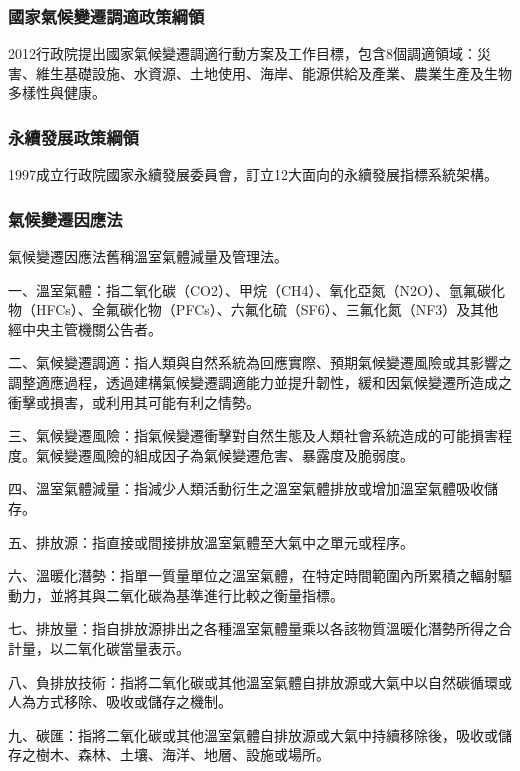 \documentclass[a4paper,12pt]{report}
\begin{document}
\begin{itemize}
\subsubsection{國家氣候變遷調適政策綱領}
2012行政院提出國家氣候變遷調適行動方案及工作目標，包含8個調適領域：災害、維生基礎設施、水資源、土地使用、海岸、能源供給及產業、農業生產及生物多樣性與健康。
\subsubsection{永續發展政策綱領}
1997成立行政院國家永續發展委員會，訂立12大面向的永續發展指標系統架構。
\subsubsection{氣候變遷因應法}
氣候變遷因應法舊稱溫室氣體減量及管理法。

一、溫室氣體：指二氧化碳（CO2）、甲烷（CH4）、氧化亞氮（N2O）、氫氟碳化物（HFCs）、全氟碳化物（PFCs）、六氟化硫（SF6）、三氟化氮（NF3）及其他經中央主管機關公告者。

二、氣候變遷調適：指人類與自然系統為回應實際、預期氣候變遷風險或其影響之調整適應過程，透過建構氣候變遷調適能力並提升韌性，緩和因氣候變遷所造成之衝擊或損害，或利用其可能有利之情勢。

三、氣候變遷風險：指氣候變遷衝擊對自然生態及人類社會系統造成的可能損害程度。氣候變遷風險的組成因子為氣候變遷危害、暴露度及脆弱度。

四、溫室氣體減量：指減少人類活動衍生之溫室氣體排放或增加溫室氣體吸收儲存。

五、排放源：指直接或間接排放溫室氣體至大氣中之單元或程序。

六、溫暖化潛勢：指單一質量單位之溫室氣體，在特定時間範圍內所累積之輻射驅動力，並將其與二氧化碳為基準進行比較之衡量指標。

七、排放量：指自排放源排出之各種溫室氣體量乘以各該物質溫暖化潛勢所得之合計量，以二氧化碳當量表示。

八、負排放技術：指將二氧化碳或其他溫室氣體自排放源或大氣中以自然碳循環或人為方式移除、吸收或儲存之機制。

九、碳匯：指將二氧化碳或其他溫室氣體自排放源或大氣中持續移除後，吸收或儲存之樹木、森林、土壤、海洋、地層、設施或場所。


\end{itemize}
\end{document}
